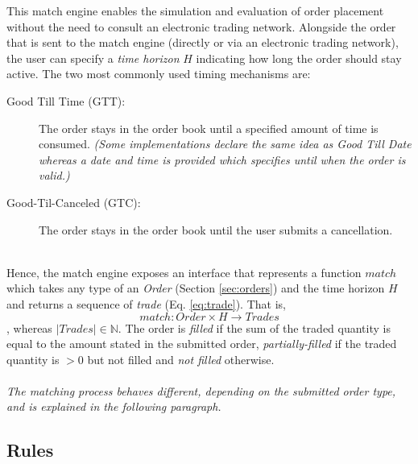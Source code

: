 This match engine enables the simulation and evaluation of order placement without the need to consult an electronic trading network.
Alongside the order that is sent to the match engine (directly or via an electronic trading network), the user can specify a \textit{time horizon} $H$ indicating how long the order should stay active.
The two most commonly used timing mechanisms are:
\begin{description}
    \item[Good Till Time (GTT): ] The order stays in the order book until a specified amount of time is consumed. \textit{(Some implementations declare the same idea as Good Till Date whereas a date and time is provided which specifies until when the order is valid.)}
    \item[Good-Til-Canceled (GTC): ] The order stays in the order book until the user submits a cancellation.
\end{description}
\hfill
\\
Hence, the match engine exposes an interface that represents a function $match$ which takes any type of an \textit{Order} (Section \ref{sec:orders}) and the time horizon $H$ and returns a sequence of \textit{trade} (Eq. \ref{eq:trade}).
That is,
\begin{equation}
    match : Order \times H \rightarrow Trades
\end{equation}
, whereas $|Trades| \in \mathbb{N}$.
The order is \textit{filled} if the sum of the traded quantity is equal to the amount stated in the submitted order, \textit{partially-filled} if the traded quantity is $> 0$ but not filled and \textit{not filled} otherwise.
\\
\\
\textit{The matching process behaves different, depending on the submitted order type, and is explained in the following paragraph.}

\subsection{Rules}

